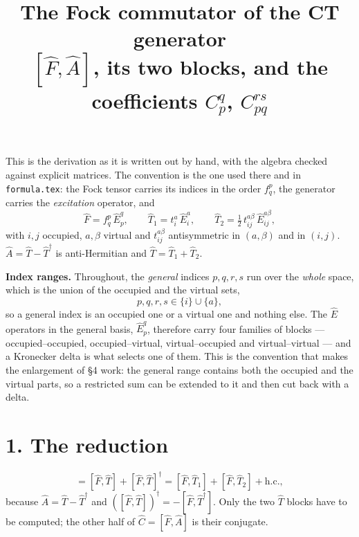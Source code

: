 \documentclass[11pt]{article}
\title{\bfseries The Fock commutator of the CT generator\\[2pt]
       \large $[\hat F,\hat A]$, its two blocks, and the coefficients $C^q_p$,
       $C^{rs}_{pq}$}
\author{}
\date{}
\newcommand{\E}[2]{\hat E^{#1}_{#2}}
\newcommand{\hc}{\mathrm{h.c.}}
\newcommand{\occ}{i}
\newcommand{\vir}{a}
\begin{document}
\maketitle
\vspace{-2.5em}

\noindent
This is the derivation as it is written out by hand, with the algebra checked
against explicit matrices. The convention is the one used there and in
\texttt{formula.tex}: the Fock tensor carries its indices in the order
$f^p_q$, the generator carries the \emph{excitation} operator, and
\begin{equation}
  \hat F=f^p_q\,\E{q}{p},
  \qquad
  \hat T_1=t^\vir_\occ\,\E{\vir}{\occ},
  \qquad
  \hat T_2=\tfrac12\,t^{\vir\beta}_{\occ j}\,\E{\vir\beta}{\occ j},
  \label{eq:ops}
\end{equation}
with $\occ,j$ occupied, $\vir,\beta$ virtual and $t^{\vir\beta}_{\occ j}$
antisymmetric in $(\vir,\beta)$ and in $(\occ,j)$.
$\hat A=\hat T-\hat T^\dagger$ is anti-Hermitian and $\hat T=\hat T_1+\hat T_2$.

\medskip
\noindent
\textbf{Index ranges.} Throughout, the \emph{general} indices $p,q,r,s$ run
over the \emph{whole} space, which is the union of the occupied and the virtual
sets,
\begin{equation}
  p,q,r,s\in\{\occ\}\cup\{\vir\},
  \label{eq:ranges}
\end{equation}
so a general index is an occupied one or a virtual one and nothing else. The
$\hat E$ operators in the general basis, $\E{q}{p}$, therefore carry four
families of blocks --- occupied--occupied, occupied--virtual,
virtual--occupied and virtual--virtual --- and a Kronecker delta is what selects
one of them. This is the convention that makes the enlargement of \S4 work: the
general range contains both the occupied and the virtual parts, so a restricted
sum can be extended to it and then cut back with a delta.

\section*{1. The reduction}

\begin{equation}
  [\hat F,\hat A]=[\hat F,\hat T]+[\hat F,\hat T]^\dagger
   =[\hat F,\hat T_1]+[\hat F,\hat T_2]+\hc,
  \label{eq:reduce}
\end{equation}
because $\hat A=\hat T-\hat T^\dagger$ and
$([\hat F,\hat T])^\dagger=-[\hat F,\hat T^\dagger]$. Only the two $\hat T$
blocks have to be computed; the other half of $\hat C=[\hat F,\hat A]$ is their
conjugate.
\end{document}
